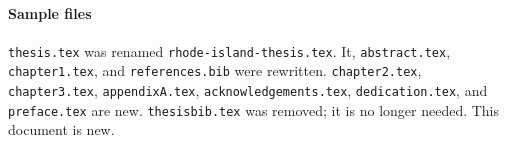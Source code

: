 \documentclass[11pt]{article}
\newcommand\file[1]{\texttt{#1}}
\begin{document}
\paragraph{Sample files}
\file{thesis.tex} was renamed \file{rhode-island-thesis.tex}.
It, \file{abstract.tex}, \file{chapter1.tex}, and
\file{references.bib} were rewritten.
\file{chapter2.tex}, \file{chapter3.tex}, \file{appendixA.tex},
\file{acknowledgements.tex}, \file{dedication.tex}, and \file{preface.tex} are
new.
\file{thesisbib.tex} was removed; it is no longer needed.
This document is new.
\end{document}
